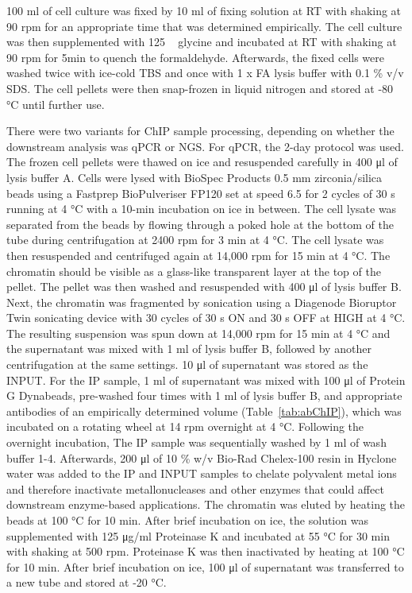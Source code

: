 100 \si{\milli\litre} of cell culture was fixed by 10 \si{\milli\litre} of fixing solution at RT with shaking at 90 rpm for an appropriate time that was determined empirically. The cell culture was then supplemented with 125 \si{\milli\Molar} glycine and incubated at RT with shaking at 90 rpm for 5\si{\minute} to quench the formaldehyde. Afterwards, the fixed cells were washed twice with ice-cold TBS and once with 1 x FA lysis buffer with 0.1 \% v/v SDS. The cell pellets were then snap-frozen in liquid nitrogen and stored at -80 \si{\celsius} until further use. 

There were two variants for ChIP sample processing, depending on whether the downstream analysis was qPCR or NGS. For qPCR, the 2-day protocol was used. The frozen cell pellets were thawed on ice and resuspended carefully in 400 \si{\micro\litre} of lysis buffer A. Cells were lysed with BioSpec Products 0.5 \si{\milli\metre} zirconia/silica beads using a Fastprep BioPulveriser FP120 set at speed 6.5 for 2 cycles of 30 \si{\second} running at 4 \si{\celsius} with a 10-\si{\minute} incubation on ice in between. The cell lysate was separated from the beads by flowing through a poked hole at the bottom of the tube during centrifugation at 2400 rpm for 3 \si{\minute} at 4 \si{\celsius}. The cell lysate was then resuspended and centrifuged again at 14,000 rpm for 15 \si{\minute} at 4 \si{\celsius}. The chromatin should be visible as a glass-like transparent layer at the top of the pellet. The pellet was then washed and resuspended with 400 \si{\micro\litre} of lysis buffer B. Next, the chromatin was fragmented by sonication using a Diagenode Bioruptor Twin sonicating device with 30 cycles of 30 \si{\second} ON and 30 \si{\second} OFF at HIGH at 4 \si{\celsius}. The resulting suspension was spun down at 14,000 rpm for 15 \si{\minute} at 4 \si{\celsius} and the supernatant was mixed with 1 \si{\milli\litre} of lysis buffer B, followed by another centrifugation at the same settings. 10 \si{\micro\litre} of supernatant was stored as the INPUT. For the IP sample, 1 \si{\milli\litre} of supernatant was mixed with 100 \si{\micro\litre} of Protein G Dynabeads, pre-washed four times with 1 \si{\milli\litre} of lysis buffer B, and appropriate antibodies of an empirically determined volume (Table~\ref{tab:abChIP}), which was incubated on a rotating wheel at 14 rpm overnight at 4 \si{\celsius}. Following the overnight incubation, The IP sample was sequentially washed by 1 \si{\milli\litre} of wash buffer 1-4. Afterwards, 200 \si{\micro\litre} of 10 \% w/v Bio-Rad Chelex-100 resin in Hyclone water was added to the IP and INPUT samples to chelate polyvalent metal ions and therefore inactivate metallonucleases and other enzymes that could affect downstream enzyme-based applications. The chromatin was eluted by heating the beads at 100 \si{\celsius} for 10 \si{\minute}. After brief incubation on ice, the solution was supplemented with 125 \si{\micro\gram/\milli\litre} Proteinase K and incubated at 55 \si{\celsius} for 30 \si{\minute} with shaking at 500 rpm. Proteinase K was then inactivated by heating at 100 \si{\celsius} for 10 \si{\minute}. After brief incubation on ice, 100 \si{\micro\litre} of supernatant was transferred to a new tube and stored at -20 \si{\celsius}. 